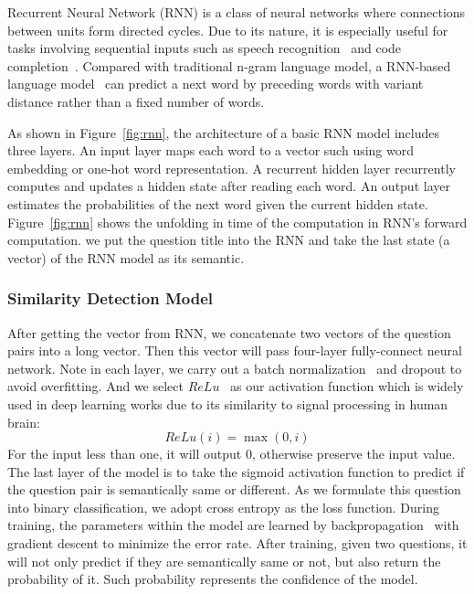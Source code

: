 	Recurrent Neural Network (RNN) is a class of neural networks where connections between units form directed cycles.
	Due to its nature, it is especially useful for tasks involving sequential inputs such as speech recognition~\cite{graves2013speech} and code completion~\cite{white2015toward}.
	Compared with traditional n-gram language model, a RNN-based language model~\cite{mikolov2010recurrent} can predict a next word by preceding words with variant distance rather than a fixed number of words.
	
	As shown in Figure~\ref{fig:rnn}, the architecture of a basic RNN model includes three layers.
	An input layer maps each word to a vector such using word embedding or one-hot word representation.
	A recurrent hidden layer recurrently computes and updates a hidden state after reading each word.
	An output layer estimates the probabilities of the next word given the current hidden state.
	Figure~\ref{fig:rnn} shows the unfolding in time of the computation in RNN's forward computation.
	we put the question title into the RNN and take the last state (a vector) of the RNN model as its semantic.
	
	\subsubsection{Similarity Detection Model}
	After getting the vector from RNN, we concatenate two vectors of the question pairs into a long vector.
	Then this vector will pass four-layer fully-connect neural network.
	Note in each layer, we carry out a batch normalization~\cite{??} and dropout\cite{??} to avoid overfitting.
	And we select $ReLu$~\cite{??} as our activation function which is widely used in deep learning works due to its similarity to signal processing in human brain:
	\begin{equation}
		ReLu(i) = \max(0, i)
	\end{equation}
	For the input less than one, it will output 0, otherwise preserve the input value.
	The last layer of the model is to take the sigmoid activation function to predict if the question pair is semantically same or different.
	As we formulate this question into binary classification, we adopt cross entropy as the loss function.
	During training, the parameters within the model are learned by backpropagation~\cite{werbos1990backpropagation} with gradient descent to minimize the error rate.
	After training, given two questions, it will not only predict if they are semantically same or not, but also return the probability of it. 
	Such probability represents the confidence of the model.
	
